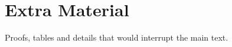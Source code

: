 \chapter{Extra Material}
\label{chap:appendix}

Proofs, tables and details that would interrupt the main text.
